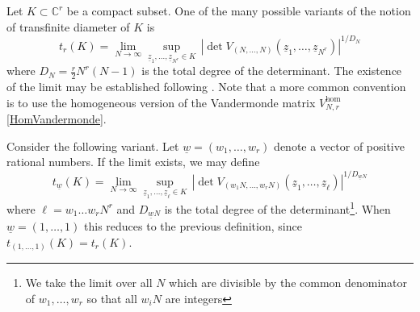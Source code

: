 \documentclass[10pt]{amsart}
\theoremstyle{definition}
\theoremstyle{remark}
\numberwithin{equation}{section}
\newcommand{\C}{\mathbb C}
\newcommand{\z}{\underline{z}}
\newcommand{\0}{\color{blue}{\mathsf{0}}}
\begin{document}
Let $K\subset \C^r$ be a compact subset. One of the many  possible variants of the  notion of  transfinite diameter of $K$ is 
\[ t_r(K) = \lim_{N\rightarrow \infty} \sup_{\z_1,\ldots, \z_{N^r} \in K}  \,  \left| \det V_{(N,\ldots, N)}(\z_1,\ldots, \z_{N^r})\right|^{1/D_N} \]
where 
$D_N =  \frac{r}{2} N^r(N-1)$ is the total degree of the determinant.
The existence of the limit may be established following  \cite{Zaharjuta}.  Note that a more common convention is to use the homogeneous version of the Vandermonde matrix $V_{N,r}^{\mathrm{hom}}$ \eqref{HomVandermonde}.   


Consider the following variant. Let $\underline{w} =(w_1,\ldots, w_r)$ denote a vector of positive rational numbers. If the limit exists, we may define
\[  t_{\underline{w}} (K) = \lim_{N\rightarrow \infty} \sup_{\z_1,\ldots, \z_{\ell} \in K}  \,  \left|  \det V_{(w_1 N,\ldots, w_r N)}(\z_1,\ldots, \z_{\ell})\right|^{1/D_{\underline{w} N}}  \]
where $\ell= w_1\ldots w_r N^r$ and $D_{\underline{w}N}$ is the total degree of the determinant\footnote{We take the limit over all $N$ which are divisible by the common denominator of $w_1,\ldots, w_r$ so that all $w_iN$ are integers}. When $\underline{w}=(1,\ldots, 1)$  this reduces to the previous definition, since    $t_{(1,\ldots, 1)}(K) = t_r(K)$. 
\end{document}
